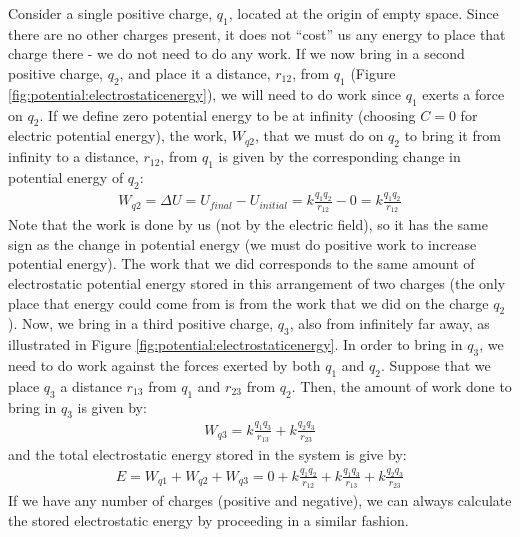 Consider a single positive charge, $q_1$, located at the origin of empty space. Since there are no other charges present, it does not ``cost'' us any energy to place that charge there - we do not need to do any work. If we now bring in a second positive charge, $q_2$, and place it a distance, $r_{12}$, from $q_1$ (Figure \ref{fig:potential:electrostaticenergy}), we will need to do work since $q_1$ exerts a force on $q_2$. If we define zero potential energy to be at infinity (choosing $C=0$ for electric potential energy), the work, $W_{q2}$, that we must do on $q_2$ to bring it from infinity to a distance, $r_{12}$, from $q_1$ is given by the corresponding change in potential energy of $q_2$:
\begin{align*}
W_{q2}=\Delta U=U_{final}-U_{initial}=k\frac{q_1q_2}{r_{12}}-0=k\frac{q_1q_2}{r_{12}}
\end{align*}
Note that the work is done by us (not by the electric field), so it has the same sign as the change in potential energy (we must do positive work to increase potential energy). The work that we did corresponds to the same amount of electrostatic potential energy stored in this arrangement of two charges (the only place that energy could come from is from the work that we did on the charge $q_2$). 
Now, we bring in a third positive charge, $q_3$, also from infinitely far away, as illustrated in Figure \ref{fig:potential:electrostaticenergy}. In order to bring in $q_3$, we need to do work against the forces exerted by both $q_1$ and $q_2$. Suppose that we place $q_3$ a distance $r_{13}$ from $q_1$ and $r_{23}$ from $q_2$. Then, the amount of work done to bring in $q_3$ is given by:
\begin{align*}
W_{q3}=k\frac{q_1q_3}{r_{13}}+k\frac{q_2q_3}{r_{23}}
\end{align*}
and the total electrostatic energy stored in the system is give by:
\begin{align*}
E = W_{q1}+W_{q2}+W_{q3}=0+k\frac{q_1q_2}{r_{12}}+k\frac{q_1q_3}{r_{13}}+k\frac{q_2q_3}{r_{23}}
\end{align*}
If we have any number of charges (positive and negative), we can always calculate the stored electrostatic energy by proceeding in a similar fashion. 


